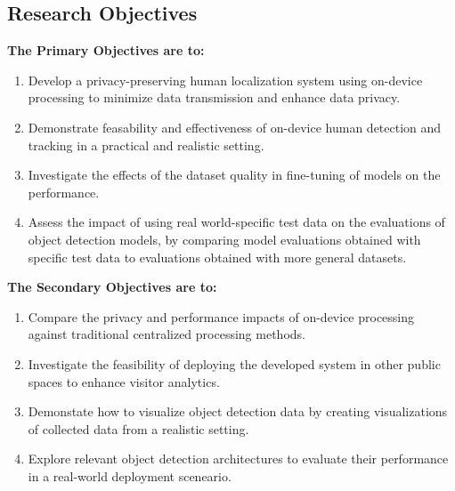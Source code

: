 \subsection{Research Objectives}
\label{sec:research_objectives}
\textbf{The Primary Objectives are to:}
\begin{enumerate}
	\item Develop a privacy-preserving human localization system using on-device processing to minimize data transmission and enhance data privacy.
	\item Demonstrate feasability and effectiveness of on-device human detection and tracking in a practical and realistic setting.
	\item Investigate the effects of the dataset quality in fine-tuning of models on the performance.
	\item Assess the impact of using real world-specific test data on the evaluations of object detection models, by comparing model evaluations obtained with specific test data to evaluations obtained with more general datasets.
\end{enumerate}

\textbf{The Secondary Objectives are to:}
\begin{enumerate}
	\item Compare the privacy and performance impacts of on-device processing against traditional centralized processing methods.
	\item Investigate the feasibility of deploying the developed system in other public spaces to enhance visitor analytics.
	\item Demonstate how to visualize object detection data by creating visualizations of collected data from a realistic setting.
	\item Explore relevant object detection architectures to evaluate their performance in a real-world deployment sceneario.
\end{enumerate}

